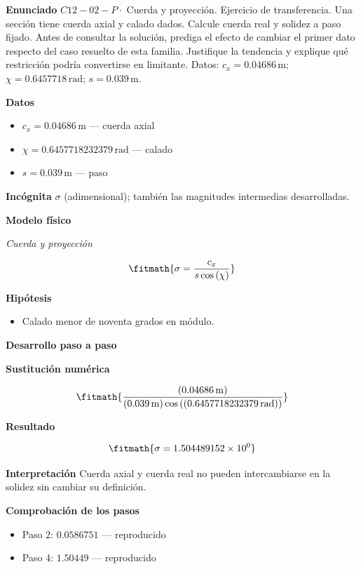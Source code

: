 \documentclass[10pt,openany]{book}
\begin{document}
\noindent\textbf{Enunciado}
\(C12-02-P \cdot\) Cuerda y proyección. Ejercicio de transferencia. Una sección tiene cuerda axial y calado dados. Calcule cuerda real y solidez a paso fijado. Antes de consultar la solución, prediga el efecto de cambiar el primer dato respecto del caso resuelto de esta familia. Justifique la tendencia y explique qué restricción podría convertirse en limitante. Datos: \(c_x=0.04686\, \mathrm{m}\); \(\chi=0.6457718\, \mathrm{rad}\); \(s=0.039\, \mathrm{m}\).

\noindent\textbf{Datos}
\begin{itemize}
\item $c_x = 0.04686\,\mathrm{m}$ — cuerda axial
\item $\chi = 0.6457718232379\,\mathrm{rad}$ — calado
\item $s = 0.039\,\mathrm{m}$ — paso
\end{itemize}

\noindent\textbf{Incógnita}
$\sigma$ (adimensional); también las magnitudes intermedias desarrolladas.

\noindent\textbf{Modelo físico}

\noindent\textit{Cuerda y proyección}

\[
\fitmath{\sigma=\frac{c_x}{s \cos{\left(\chi \right)}}}
\]

\noindent\textbf{Hipótesis}
\begin{itemize}
\item Calado menor de noventa grados en módulo.
\end{itemize}

\noindent\textbf{Desarrollo paso a paso}



\noindent\textbf{Sustitución numérica}

\[
\fitmath{\frac{\left(0.04686\,\mathrm{m}\right)}{\left(0.039\,\mathrm{m}\right) \cos{\left(\left(0.6457718232379\,\mathrm{rad}\right) \right)}}}
\]

\noindent\textbf{Resultado}

\[
\fitmath{\sigma=1.504489152\times10^{0}}
\]

\noindent\textbf{Interpretación}
Cuerda axial y cuerda real no pueden intercambiarse en la solidez sin cambiar su definición.

\noindent\textbf{Comprobación de los pasos}
\begin{itemize}
\item Paso 2: $0.0586751$ — reproducido
\item Paso 4: $1.50449$ — reproducido
\end{itemize}
\end{document}
